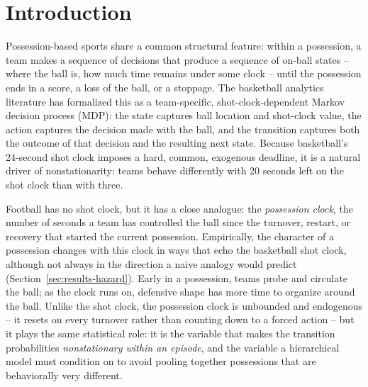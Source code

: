 \documentclass[11pt]{article}
\theoremstyle{plain}
\theoremstyle{definition}
\theoremstyle{remark}
\begin{document}
\clearpage
{}
\pagestyle{fancy}
\tableofcontents
\clearpage

\section{Introduction}
\label{sec:intro}

Possession-based sports share a common structural feature: within a possession, a team makes a sequence of decisions that produce a sequence of on-ball states -- where the ball is, how much time remains under some clock -- until the possession ends in a score, a loss of the ball, or a stoppage. The basketball analytics literature has formalized this as a team-specific, shot-clock-dependent Markov decision process (MDP): the state captures ball location and shot-clock value, the action captures the decision made with the ball, and the transition captures both the outcome of that decision and the resulting next state. Because basketball's 24-second shot clock imposes a hard, common, exogenous deadline, it is a natural driver of nonstationarity: teams behave differently with 20 seconds left on the shot clock than with three.

Football has no shot clock, but it has a close analogue: the \emph{possession clock}, the number of seconds a team has controlled the ball since the turnover, restart, or recovery that started the current possession. Empirically, the character of a possession changes with this clock in ways that echo the basketball shot clock, although not always in the direction a naive analogy would predict (Section~\ref{sec:results-hazard}). Early in a possession, teams probe and circulate the ball; as the clock runs on, defensive shape has more time to organize around the ball. Unlike the shot clock, the possession clock is unbounded and endogenous -- it resets on every turnover rather than counting down to a forced action -- but it plays the same statistical role: it is the variable that makes the transition probabilities \emph{nonstationary within an episode}, and the variable a hierarchical model must condition on to avoid pooling together possessions that are behaviorally very different.
\end{document}
